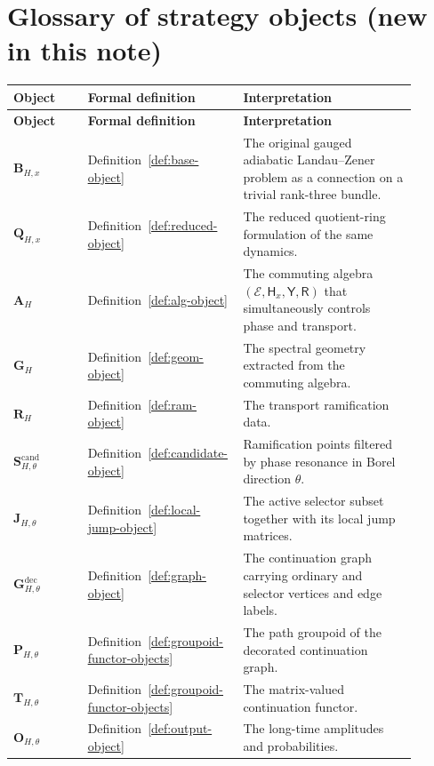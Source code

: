 \documentclass[11pt]{article}
\newcommand{\Eu}{\mathcal E}
\newcommand{\Hx}{\mathsf H_x}
\newcommand{\Yop}{\mathsf Y}
\newcommand{\Rop}{\mathsf R}
\begin{document}
\section{Glossary of strategy objects (new in this note)}

\small
\begin{longtable}{P{0.18\linewidth}P{0.30\linewidth}P{0.42\linewidth}}
\toprule
\textbf{Object} & \textbf{Formal definition} & \textbf{Interpretation}\\
\midrule
\endfirsthead
\toprule
\textbf{Object} & \textbf{Formal definition} & \textbf{Interpretation}\\
\midrule
\endhead
$\mathbf B_{H,x}$ & Definition~\ref{def:base-object} & The original gauged adiabatic Landau--Zener problem as a connection on a trivial rank-three bundle.\\
$\mathbf Q_{H,x}$ & Definition~\ref{def:reduced-object} & The reduced quotient-ring formulation of the same dynamics.\\
$\mathbf A_H$ & Definition~\ref{def:alg-object} & The commuting algebra $(\Eu,\Hx,\Yop,\Rop)$ that simultaneously controls phase and transport.\\
$\mathbf G_H$ & Definition~\ref{def:geom-object} & The spectral geometry extracted from the commuting algebra.\\
$\mathbf R_H$ & Definition~\ref{def:ram-object} & The transport ramification data.\\
$\mathbf S^{\mathrm{cand}}_{H,\theta}$ & Definition~\ref{def:candidate-object} & Ramification points filtered by phase resonance in Borel direction $\theta$.\\
$\mathbf J_{H,\theta}$ & Definition~\ref{def:local-jump-object} & The active selector subset together with its local jump matrices.\\
$\mathbf G^{\mathrm{dec}}_{H,\theta}$ & Definition~\ref{def:graph-object} & The continuation graph carrying ordinary and selector vertices and edge labels.\\
$\mathbf P_{H,\theta}$ & Definition~\ref{def:groupoid-functor-objects} & The path groupoid of the decorated continuation graph.\\
$\mathbf T_{H,\theta}$ & Definition~\ref{def:groupoid-functor-objects} & The matrix-valued continuation functor.\\
$\mathbf O_{H,\theta}$ & Definition~\ref{def:output-object} & The long-time amplitudes and probabilities.\\
\bottomrule
\end{longtable}
\normalsize
\end{document}
